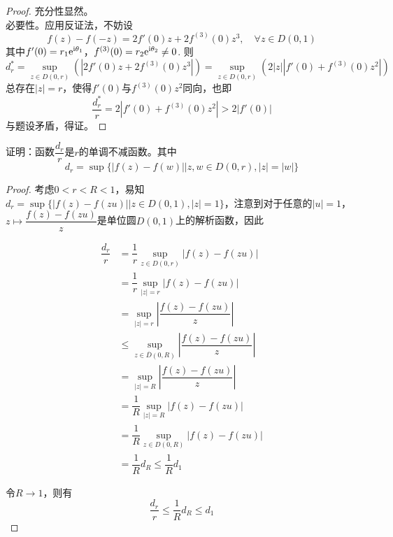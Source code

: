\begin{proof}

    充分性显然。\\
    必要性。应用反证法，不妨设
    $$f(z) - f(-z) = 2f'(0)z + 2f^{(3)}(0)z^3, \quad \forall z \in D(0,1)$$
    其中$f'(0) = r_1\mathrm{e}^{\mathrm{i} \theta_1}$，$f^{(3)}(0) = r_2\mathrm{e}^{\mathrm{i} \theta_2} \neq 0$. 则
    $$d_r^{*} = \sup\limits_{z \in D(0,r)}{(|2f'(0)z + 2f^{(3)}(0)z^3|)} = \sup\limits_{z \in D(0,r)}{(2|z||f'(0) + f^{(3)}(0)z^2|)}$$
    总存在$|z| = r$，使得$f'(0)$与$f^{(3)}(0)z^2$同向，也即
    $$\dfrac{d_r^{*}}{r} = 2|f'(0) + f^{(3)}(0)z^2| > 2|f'(0)|$$
    与题设矛盾，得证。

\end{proof}

\begin{proposition}

    证明：函数$\dfrac{d_r}{r}$是$r$的单调不减函数。其中
    $$d_r = \sup\{|f(z) - f(w)|\big| z,w \in D(0,r), |z| = |w|\}$$

\end{proposition}

\begin{proof}

    考虑$0 < r < R < 1$，易知$d_r = \sup\{|f(z) - f(zu)| \big| z \in D(0,1), |z| = 1 \}$，注意到对于任意的$|u| = 1$，$z \mapsto  \dfrac{f(z) - f(zu)}{z}$是单位圆$D(0,1)$上的解析函数，因此
    
    \begin{align*}
        \dfrac{d_r}{r} & = \dfrac{1}{r} \sup_{z \in D(0,r)}{|f(z) - f(zu)|} \\
        & = \dfrac{1}{r} \sup_{|z| = r}{|f(z) - f(zu)|} \\
        & = \sup_{|z| = r}{\left| \dfrac{f(z) - f(zu)}{z}\right|} \\
        & \leq \sup_{z \in \overline{D}(0,R)}{\left| \dfrac{f(z) - f(zu)}{z}\right|} \\
        & = \sup_{|z| = R}{\left| \dfrac{f(z) - f(zu)}{z}\right|} \\
        & = \dfrac{1}{R} \sup_{|z| = R}{|f(z) - f(zu)|} \\
        & = \dfrac{1}{R} \sup_{z \in D(0,R)}{|f(z) - f(zu)|} \\
        & = \dfrac{1}{R} d_{R} \leq \dfrac{1}{R} d_{1}
    \end{align*}

    令$R \to 1$，则有
    $$\dfrac{d_{r}}{r} \leq \dfrac{1}{R} d_{R} \leq d_1$$

\end{proof}


